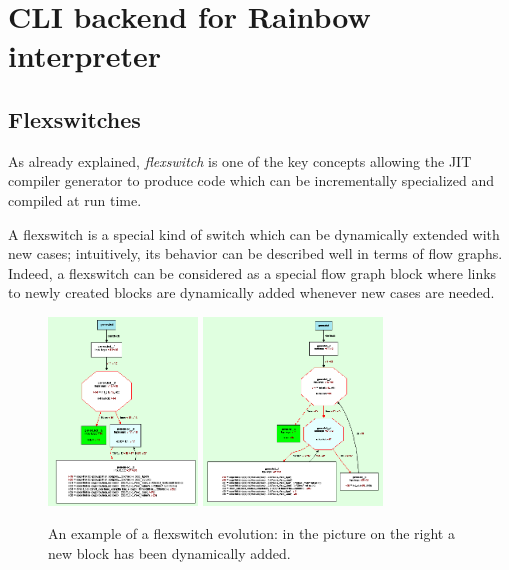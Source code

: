 \section{CLI backend for Rainbow interpreter}

%
%
%

\subsection{Flexswitches}

As already explained,  \emph{flexswitch} is one of the key
concepts allowing the JIT compiler generator to produce code which can
be incrementally specialized and compiled at run time.

A flexswitch is a special kind of switch which can be dynamically
extended with new cases; intuitively, its behavior can be described
well in terms of flow graphs. Indeed, a flexswitch can be considered 
as a special flow graph block where links to newly created blocks are
dynamically added whenever new cases are needed. 

\begin{figure}[h]
\begin{center}
\includegraphics[height=5cm]{flexswitch1}
\includegraphics[height=5cm]{flexswitch2}
\caption{An example of a flexswitch evolution: in the picture on the
  right a new block has been dynamically added.}\label{flexswitch-fig}
\end{center}
\end{figure}

